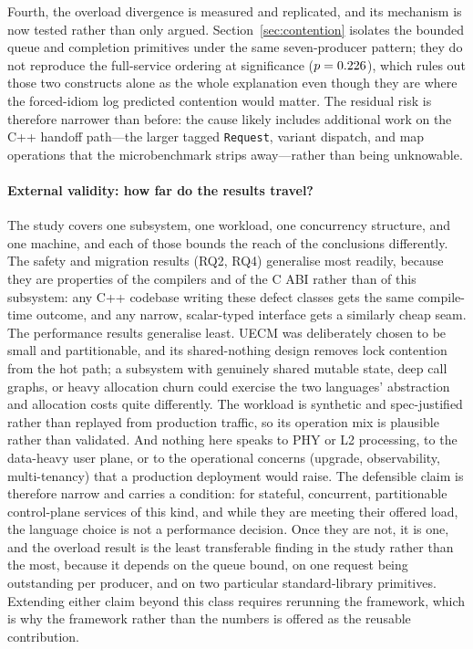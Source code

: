 \documentclass[english,twoside,openright,a4paper,censored,csm,software-track-2020]{HYthesisML}
\begin{document}
Fourth, the overload divergence is measured and replicated, and its mechanism is now tested
rather than only argued. Section~\ref{sec:contention} isolates the bounded queue and completion
primitives under the same seven-producer pattern; they do not reproduce the full-service ordering
at significance ($p = 0.226$), which rules out those two constructs alone as the whole
explanation even though they are where the forced-idiom log predicted contention would matter.
The residual risk is therefore narrower than before: the cause likely includes additional work on
the C++ handoff path---the larger tagged \texttt{Request}, variant dispatch, and map operations
that the microbenchmark strips away---rather than being unknowable.

\paragraph{External validity: how far do the results travel?}
The study covers one subsystem, one workload, one concurrency structure, and one machine, and
each of those bounds the reach of the conclusions differently. The safety and migration
results (RQ2, RQ4) generalise most readily, because they are properties of the compilers and
of the C ABI rather than of this subsystem: any C++ codebase writing these defect classes gets
the same compile-time outcome, and any narrow, scalar-typed interface gets a similarly cheap
seam. The performance results generalise least. UECM was deliberately chosen to be small and
partitionable, and its shared-nothing design removes lock contention from the hot path;
a subsystem with genuinely shared mutable state, deep call graphs, or heavy allocation
churn could exercise the two languages' abstraction and allocation costs quite differently. The
workload is synthetic and spec-justified rather than replayed from production traffic, so its
operation mix is plausible rather than validated. And nothing here speaks to PHY or L2
processing, to the data-heavy user plane, or to the operational concerns (upgrade,
observability, multi-tenancy) that a production deployment would raise. The defensible claim
is therefore narrow and carries a condition: for stateful, concurrent, partitionable
control-plane services of this kind, and while they are meeting their offered load, the language
choice is not a performance decision. Once they are not, it is one, and the overload result is
the least transferable finding in the study rather than the most, because it depends on the queue
bound, on one request being outstanding per producer, and on two particular standard-library
primitives. Extending either claim beyond this class requires rerunning the framework, which is
why the framework rather than the numbers is offered as the reusable contribution.
\end{document}
